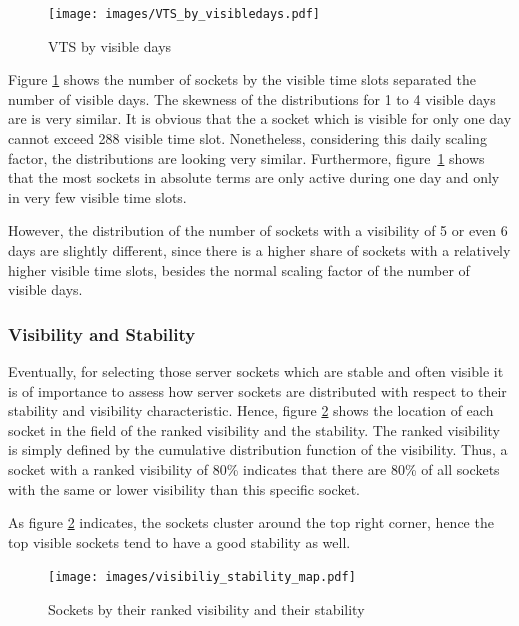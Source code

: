 \begin{figure}
	[hb] \centering 
	\texttt{[image: images/VTS\_by\_visibledays.pdf]}
	\caption{VTS by visible days} 
	\label{fig:vts_by_visibledays} 
\end{figure}

Figure \ref{fig:vts_by_visibledays} shows the number of sockets by the visible time slots separated the number of visible days. The skewness of the 
distributions for 1 to 4 visible days are is very similar. It is obvious that 
the a socket which is visible for only one day cannot exceed 288 visible time 
slot. Nonetheless, considering this daily scaling factor, the distributions are 
looking very similar. Furthermore, figure \ref{fig:vts_by_visibledays} shows 
that the most sockets in absolute terms are only active during one day and only 
in very few visible time slots. 

However, the distribution of the number of sockets with a visibility of 5 or 
even 6 days are slightly different, since there is a higher share of sockets 
with a relatively higher visible time slots, besides the normal scaling factor 
of the number of visible days.

\subsubsection{Visibility and Stability}
Eventually, for selecting those \glspl{server socket} which are stable and often 
visible it is of importance to assess how \glspl{server socket} are distributed 
with respect to their stability and visibility characteristic. Hence, figure 
\ref{fig:rankedVisibility} shows the location of each socket in the field of the 
ranked visibility and the stability. The ranked visibility is simply defined by 
the cumulative distribution function of the visibility. Thus, a socket with a 
ranked visibility of 80\% indicates that there are 80\% of all sockets with the 
same or lower visibility than this specific socket. 

As figure \ref{fig:rankedVisibility} indicates, the sockets cluster around the 
top right corner, hence the top visible sockets tend to have a good stability as 
well.

\begin{figure}
	[hb] \centering 
	\texttt{[image: images/visibiliy\_stability\_map.pdf]}
	\caption{Sockets by their ranked visibility and their stability} 
	\label{fig:rankedVisibility} 
\end{figure}

